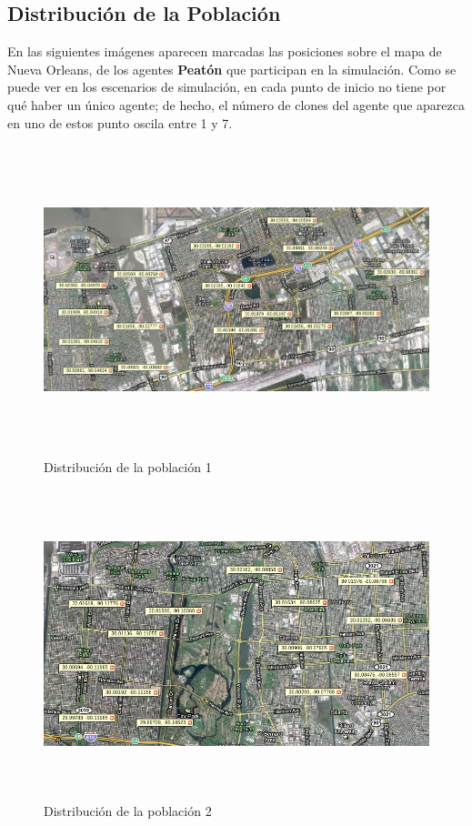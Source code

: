\subsection{Distribución de la Población}

En las siguientes imágenes aparecen marcadas las posiciones sobre el mapa de
Nueva Orleans, de los agentes {\bf Peatón} que participan en la simulación.
Como se puede ver en los escenarios de simulación, en cada punto de inicio no
tiene por qué haber un único agente; de hecho, el número de clones del agente
que aparezca en uno de estos punto oscila entre 1 y 7.

\begin{figure}[H]
 \centering
 \includegraphics[height=90mm,angle=90]{figuras/cap6/population.png}
 \caption{Distribución de la población 1}
\end{figure}

\begin{figure}[H]
 \centering
 \includegraphics[height=90mm,angle=90]{figuras/cap6/population1.png}
 \caption{Distribución de la población 2}
\end{figure}

